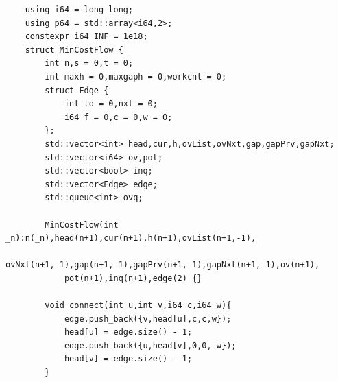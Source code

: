 \begin{lstlisting}
    using i64 = long long;
    using p64 = std::array<i64,2>;
    constexpr i64 INF = 1e18;
    struct MinCostFlow {
        int n,s = 0,t = 0;
        int maxh = 0,maxgaph = 0,workcnt = 0;
        struct Edge {
            int to = 0,nxt = 0;
            i64 f = 0,c = 0,w = 0;
        };
        std::vector<int> head,cur,h,ovList,ovNxt,gap,gapPrv,gapNxt;
        std::vector<i64> ov,pot;
        std::vector<bool> inq;
        std::vector<Edge> edge;
        std::queue<int> ovq;
    
        MinCostFlow(int _n):n(_n),head(n+1),cur(n+1),h(n+1),ovList(n+1,-1),
            ovNxt(n+1,-1),gap(n+1,-1),gapPrv(n+1,-1),gapNxt(n+1,-1),ov(n+1),
            pot(n+1),inq(n+1),edge(2) {}
    
        void connect(int u,int v,i64 c,i64 w){
            edge.push_back({v,head[u],c,c,w});
            head[u] = edge.size() - 1;
            edge.push_back({u,head[v],0,0,-w});
            head[v] = edge.size() - 1;
        }
    

\end{lstlisting}
